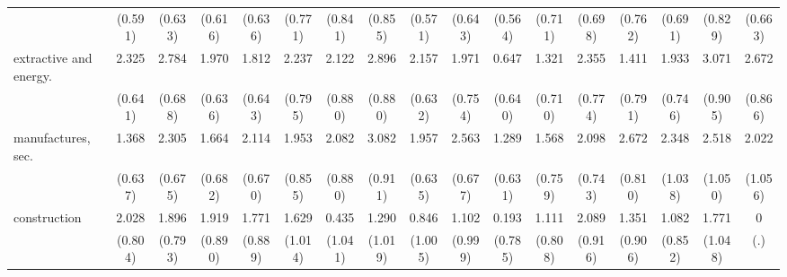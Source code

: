 {\begin{tabular}{l*{16}{c}}
                    &     (0.591)         &     (0.633)         &     (0.616)         &     (0.636)         &     (0.771)         &     (0.841)         &     (0.855)         &     (0.571)         &     (0.643)         &     (0.564)         &     (0.711)         &     (0.698)         &     (0.762)         &     (0.691)         &     (0.829)         &     (0.663)         \\
[1em]
extractive and energy.&       2.325\sym{***}&       2.784\sym{***}&       1.970\sym{**} &       1.812\sym{**} &       2.237\sym{**} &       2.122\sym{*}  &       2.896\sym{***}&       2.157\sym{***}&       1.971\sym{**} &       0.647         &       1.321         &       2.355\sym{**} &       1.411         &       1.933\sym{**} &       3.071\sym{***}&       2.672\sym{**} \\
                    &     (0.641)         &     (0.688)         &     (0.636)         &     (0.643)         &     (0.795)         &     (0.880)         &     (0.880)         &     (0.632)         &     (0.754)         &     (0.640)         &     (0.710)         &     (0.774)         &     (0.791)         &     (0.746)         &     (0.905)         &     (0.866)         \\
[1em]
manufactures, sec.  &       1.368\sym{*}  &       2.305\sym{***}&       1.664\sym{*}  &       2.114\sym{**} &       1.953\sym{*}  &       2.082\sym{*}  &       3.082\sym{***}&       1.957\sym{**} &       2.563\sym{***}&       1.289\sym{*}  &       1.568\sym{*}  &       2.098\sym{**} &       2.672\sym{***}&       2.348\sym{*}  &       2.518\sym{*}  &       2.022         \\
                    &     (0.637)         &     (0.675)         &     (0.682)         &     (0.670)         &     (0.855)         &     (0.880)         &     (0.911)         &     (0.635)         &     (0.677)         &     (0.631)         &     (0.759)         &     (0.743)         &     (0.810)         &     (1.038)         &     (1.050)         &     (1.056)         \\
[1em]
construction        &       2.028\sym{*}  &       1.896\sym{*}  &       1.919\sym{*}  &       1.771\sym{*}  &       1.629         &       0.435         &       1.290         &       0.846         &       1.102         &       0.193         &       1.111         &       2.089\sym{*}  &       1.351         &       1.082         &       1.771         &           0         \\
                    &     (0.804)         &     (0.793)         &     (0.890)         &     (0.889)         &     (1.014)         &     (1.041)         &     (1.019)         &     (1.005)         &     (0.999)         &     (0.785)         &     (0.808)         &     (0.916)         &     (0.906)         &     (0.852)         &     (1.048)         &         (.)         \\

\end{tabular}}
